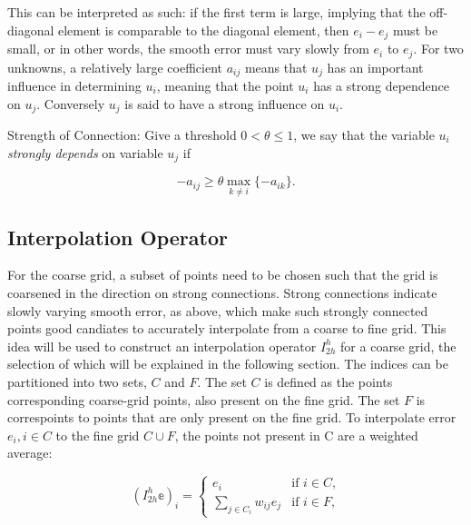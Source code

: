 This can be interpreted as such: if the first term is large, implying that the off-diagonal element is comparable to the diagonal element, then $e_i - e_j$ must be small, or in other words, the smooth error must vary slowly from $e_i$ to $e_j$. For two unknowns, a relatively large coefficient $a_{ij}$ means that $u_j$ has an important influence in determining $u_i$, meaning that the point $u_i$ has a strong dependence on $u_j$. Conversely $u_j$ is said to have a strong influence on $u_i$. 

Strength of Connection: Give a threshold $0 < \theta \leq 1$, we say that the variable $u_i$ \emph{strongly depends} on variable $u_j$ if

\begin{equation}
-a_{ij} \geq \theta \max_{k \neq i}{\{-a_{ik}\}}.
\label{eq:strong_connection2}
\end{equation}


\subsection{Interpolation Operator} %

For the coarse grid, a subset of points need to be chosen such that the grid is coarsened in the direction on strong connections. Strong connections indicate slowly varying smooth error, as above, which make such strongly connected points good candiates to accurately interpolate from a coarse to fine grid. This idea will be used to construct an interpolation operator $I_{2h}^h$ for a coarse grid, the selection of which will be explained in the following section. The indices can be partitioned into two sets, $C$ and $F$. The set $C$ is defined as the points corresponding coarse-grid points, also present on the fine grid. The set $F$ is correspoints to points that are only present on the fine grid. To interpolate error $e_i, i \in C$ to the fine grid $C \cup F$, the points not present in C are a weighted average:


\begin{equation}
	(I_{2h}^h\mathbb{e})_i = 
		\begin{cases}
			e_i & \text{if $i \in C$,} \\
			\displaystyle \sum_{j \in C_i}{w_{ij}e_j} & \text{if $i \in F$,}
		\end{cases}
	\label{eq:interpolation_operator}
\end{equation}

